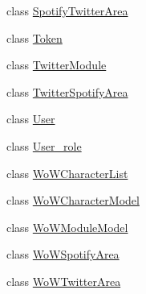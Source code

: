 \begin{DoxyCompactItemize}
class \mbox{\hyperlink{classArea_1_1Models_1_1SpotifyTwitterArea}{Spotify\+Twitter\+Area}}
\item 
class \mbox{\hyperlink{classArea_1_1Models_1_1Token}{Token}}
\item 
class \mbox{\hyperlink{classArea_1_1Models_1_1TwitterModule}{Twitter\+Module}}
\item 
class \mbox{\hyperlink{classArea_1_1Models_1_1TwitterSpotifyArea}{Twitter\+Spotify\+Area}}
\item 
class \mbox{\hyperlink{classArea_1_1Models_1_1User}{User}}
\item 
class \mbox{\hyperlink{classArea_1_1Models_1_1User__role}{User\+\_\+role}}
\item 
class \mbox{\hyperlink{classArea_1_1Models_1_1WoWCharacterList}{Wo\+W\+Character\+List}}
\item 
class \mbox{\hyperlink{classArea_1_1Models_1_1WoWCharacterModel}{Wo\+W\+Character\+Model}}
\item 
class \mbox{\hyperlink{classArea_1_1Models_1_1WoWModuleModel}{Wo\+W\+Module\+Model}}
\item 
class \mbox{\hyperlink{classArea_1_1Models_1_1WoWSpotifyArea}{Wo\+W\+Spotify\+Area}}
\item 
class \mbox{\hyperlink{classArea_1_1Models_1_1WoWTwitterArea}{Wo\+W\+Twitter\+Area}}
\end{DoxyCompactItemize}

